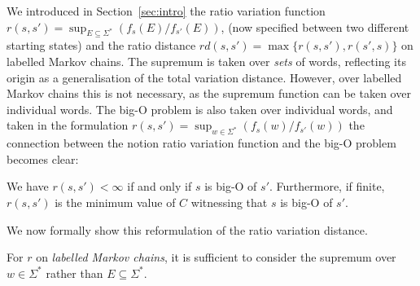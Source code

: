 \documentclass[10pt,a4paper]{amsart}
\numberwithin{equation}{section}
\theoremstyle{plain}
\theoremstyle{definition}
\theoremstyle{remark}
\newcommand\tvra{\mathit{r}}
\newcommand\tvrs{\mathit{rd}}
\begin{document}
We introduced in Section~\ref{sec:intro} the ratio variation function $\tvra(s,s') = \sup_{E \subseteq \Sigma^*} (f_{s}(E) / f_{s'}(E))$, (now specified between two different starting states) and the ratio distance $\tvrs(s,s') = \max\{\tvra(s,s') ,\tvra(s',s) \}$ on labelled Markov chains.
The supremum is taken over \emph{sets} of words, reflecting its origin as a generalisation of the total variation distance. However, over labelled Markov chains this is not necessary, as the supremum function can be taken over individual words. The big-O problem is also taken over individual words, and taken in the formulation  $\tvra(s,s') = \sup_{w \in \Sigma^*} (f_{s}(w) / f_{s'}(w))$ the connection between the notion ratio variation function and the big-O problem becomes clear: \begin{obs}
  \label{obs:bigorvd} We have 
  $\tvra(s,s')< \infty$ if and only if $s$ is big-O of $s'$. Furthermore, if finite, $\tvra(s,s')$ is the minimum value of $C$ witnessing that $s$ is big-O of $s'$.\end{obs} We now formally show this reformulation of the ratio variation distance.

\begin{prop} \label{prop:simplifytvrasa}
For $\tvra$ on \textit{labelled Markov chains},  it is sufficient to consider the supremum over  $w\in \Sigma^*$ rather than $E\subseteq \Sigma^*$.\end{prop}
\end{document}
